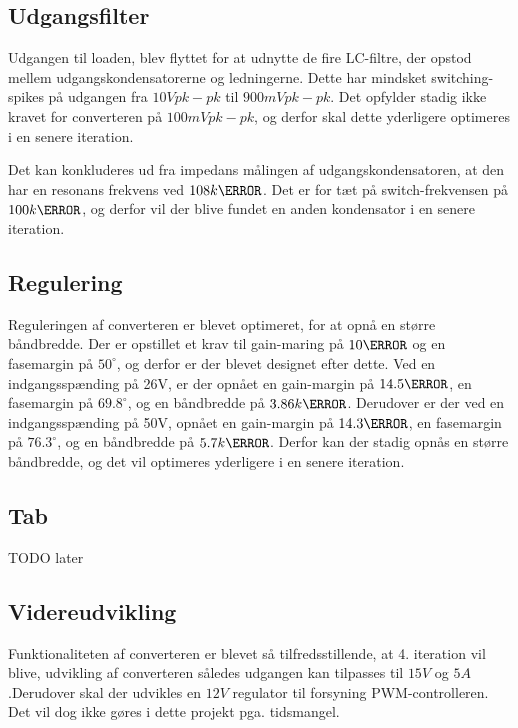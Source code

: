 \subsection{Udgangsfilter}
Udgangen til loaden, blev flyttet for at udnytte de fire LC-filtre, der opstod mellem udgangskondensatorerne og ledningerne. Dette har mindsket switching-spikes på udgangen fra $10Vpk-pk$ til $900mVpk-pk$. Det opfylder stadig ikke kravet for converteren på $100mVpk-pk$, og derfor skal dette yderligere optimeres i en senere iteration. 

Det kan konkluderes ud fra impedans målingen af udgangskondensatoren, at den har en resonans frekvens ved $108k\hertz$. Det er for tæt på switch-frekvensen på $100k\hertz$, og derfor vil der blive fundet en anden kondensator i en senere iteration.



\subsection{Regulering}
Reguleringen af converteren er blevet optimeret, for at opnå en større båndbredde. Der er opstillet et krav til gain-maring på $10\decibel$ og en fasemargin på $50^\circ$, og derfor er der blevet designet efter dette. Ved en indgangsspænding på 26V, er der opnået en gain-margin på $14.5\decibel$, en fasemargin på $69.8^\circ$, og en båndbredde på $3.86k\hertz$. Derudover er der ved en indgangsspænding på 50V, opnået en gain-margin på $14.3\decibel$, en fasemargin på $76.3^\circ$, og en båndbredde på $5.7k\hertz$. Derfor kan der stadig opnås en større båndbredde, og det vil optimeres yderligere i en senere iteration.


\subsection{Tab}
TODO later


\subsection{Videreudvikling}
Funktionaliteten af converteren er blevet så tilfredsstillende, at 4. iteration vil blive, udvikling af converteren således udgangen kan tilpasses til $15V$ og $5A$.Derudover skal der udvikles en $12V$ regulator til forsyning PWM-controlleren. Det vil dog ikke gøres i dette projekt pga. tidsmangel. 





